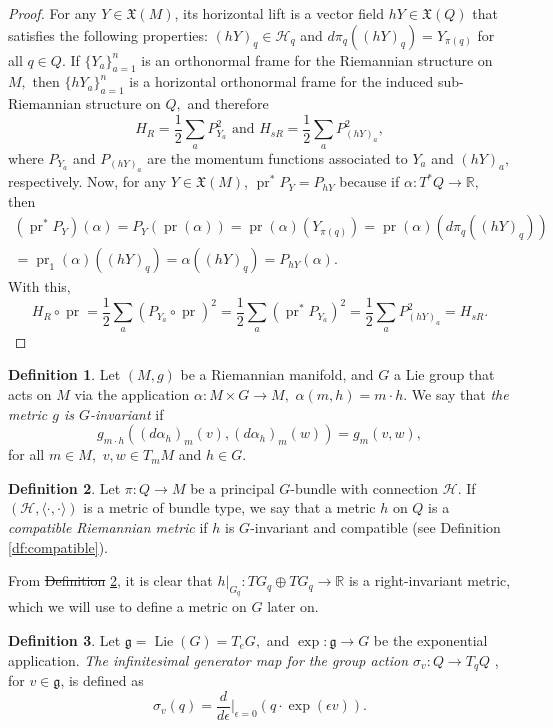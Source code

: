 \documentclass[12pt, letterpaper, reqno]{amsart}
\theoremstyle{definition}
\newtheorem{df}{Definition}
\theoremstyle{plain}
\theoremstyle{remark}
\providecommand{\DIFadd}[1]{{\protect\color{blue}\uwave{#1}}} %
\providecommand{\DIFdel}[1]{{\protect\color{red}\sout{#1}}}                      %
\providecommand{\DIFaddbegin}{} %
\providecommand{\DIFaddend}{} %
\providecommand{\DIFdelbegin}{} %
\providecommand{\DIFdelend}{} %
\newcommand{\DIFscaledelfig}{0.5}
\newlength{\DIFdelgraphicswidth} %
\newlength{\DIFdelgraphicsheight} %
\newcommand{\DIFaddincludegraphics}[2][]{{\color{blue}\fbox{\DIFOincludegraphics[#1]{#2}}}} %
\newcommand{\DIFdelincludegraphics}[2][]{%
\sbox{\DIFdelgraphicsbox}{\DIFOincludegraphics[#1]{#2}}%
\settoboxwidth{\DIFdelgraphicswidth}{\DIFdelgraphicsbox} %
\settoboxtotalheight{\DIFdelgraphicsheight}{\DIFdelgraphicsbox} %
\scalebox{\DIFscaledelfig}{%
\parbox[b]{\DIFdelgraphicswidth}{\usebox{\DIFdelgraphicsbox}\\[-\baselineskip] \rule{\DIFdelgraphicswidth}{0em}}\llap{\resizebox{\DIFdelgraphicswidth}{\DIFdelgraphicsheight}{%
\setlength{\unitlength}{\DIFdelgraphicswidth}%
\begin{picture}(1,1)%
\thicklines\linethickness{2pt} %
{\color[rgb]{1,0,0}\put(0,0){\framebox(1,1){}}}%
{\color[rgb]{1,0,0}\put(0,0){\line( 1,1){1}}}%
{\color[rgb]{1,0,0}\put(0,1){\line(1,-1){1}}}%
\end{picture}%
}\hspace*{3pt}}} %
} %
\DeclareRobustCommand{\DIFaddbegin}{\DIFOaddbegin \let\includegraphics\DIFaddincludegraphics} %
\DeclareRobustCommand{\DIFaddend}{\DIFOaddend \let\includegraphics\DIFOincludegraphics} %
\DeclareRobustCommand{\DIFdelbegin}{\DIFOdelbegin \let\includegraphics\DIFdelincludegraphics} %
\DeclareRobustCommand{\DIFdelend}{\DIFOaddend \let\includegraphics\DIFOincludegraphics} %
\begin{document}
\begin{proof}
	For any $ Y \in \mathfrak{X}(M) $, its horizontal lift is a vector field $ hY \in \mathfrak{X}(Q) $ that satisfies the following properties: $ (hY)_q \in \mathcal{H}_q $ and $ d\pi_q( (hY)_q) = Y_{\pi(q)}$ for all $ q\in Q. $  If $\{Y_a\}_{a=1}^n $ is an orthonormal frame for the Riemannian structure on $ M, $ then $ \{hY_a\}_{a=1}^n $ is a horizontal orthonormal frame for the induced sub-Riemannian structure on $ Q, $ and therefore
	$$ H_R = \frac{1}{2} \sum^{}_{a} P_{Y_a}^2 \text{ and } H_{sR} = \frac{1}{2} \sum^{}_{a} P_{(hY)_a}^2, $$ 
	where $ P_{Y_a} $ and $ P_{(hY)_a} $ are the momentum functions associated to $ Y_a $ and $ (hY)_a, $ respectively. Now, for any $ Y\in \mathfrak{X}(M) $, $ \operatorname{pr} ^* P_Y = P_{hY}$ because if $ \alpha: T^*Q \rightarrow \mathbb{R}, $ then
	\begin{align*}
	(\operatorname{pr}^*P_Y)(\alpha)=P_Y( \operatorname{pr} (\alpha)) = \operatorname{pr} (\alpha) (Y_{\pi(q)}) = \operatorname{pr} (\alpha) \left( d\pi_q((hY)_q) \right) \\= \operatorname{pr}_1(\alpha) \left( (hY)_q \right) =\alpha( (hY)_q ) =  P_{hY}(\alpha).  
	\end{align*}
	With this, 
	$$ H_R \circ \operatorname{pr} = \frac{1}{2} \sum^{}_{a} (P_{Y_a}\circ \operatorname{pr} )^2 = \frac{1}{2} \sum^{}_{a} (\operatorname{pr}^* P_{Y_a})^2 = \frac{1}{2} \sum^{}_{a} P_{(hY)_a}^2=H_{sR}. $$ 
\end{proof}
\begin{df}
	Let $ (M,g) $ be a Riemannian manifold, and $G $ a Lie group that acts on $ M $ via the application $ \alpha: M\times G \rightarrow M, $ $ \alpha(m,h)= m\cdot h. $ We say that \textit{the metric $ g $ is $ G $-invariant} if  
	$$ g_{m\cdot h}((d\alpha_h)_m(v),(d\alpha_h)_m(w))=g_m(v,w), $$ 
	for all $ m\in M, $ $ v,w\in T_mM $ and $ h\in G. $ 
\end{df}

\begin{df}\label{df:compatible_riemannian_metric}
	Let $ \pi: Q \rightarrow M $ be a principal $ G $-bundle with connection $ \mathcal{H}. $ If $ (\mathcal{H},\langle\cdot,\cdot\rangle) $ is a metric of bundle type, we say that a metric $ h $ on $ Q $ is a \textit{compatible Riemannian metric} if $ h $ is $ G $-invariant and compatible (see Definition \ref{df:compatible}).
\end{df}
 From \DIFdelbegin \DIFdel{Definition }\DIFdelend \DIFaddbegin \DIFadd{definition }\DIFaddend \ref{df:compatible_riemannian_metric}, it is clear that $ h|_{G_q}: TG_q \oplus TG_q \rightarrow \mathbb{R} $ is a right-invariant metric, which we will use to define a metric on $ G $ later on.
 \begin{df}
Let $ \mathfrak{g}= \operatorname{Lie}(G)=T_eG, $ and $ \operatorname{exp} : \mathfrak{g}\rightarrow G $ be the exponential application. \textit{The infinitesimal generator map for the group action $ \sigma_v: Q\rightarrow T_qQ $ }, for $ v \in \mathfrak{g} $,  is defined as
$$ \sigma_v(q) = \frac{d}{d\epsilon} \Big|_{\epsilon=0} \left( q\cdot \operatorname{exp} (\epsilon v) \right).$$ 
 \end{df}
\end{document}
